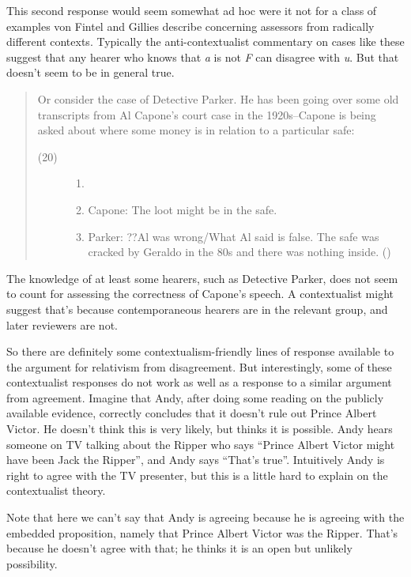 \documentclass[
  11pt,
  letterpaper,
  DIV=11,
  numbers=noendperiod,
  twoside]{scrartcl}
\begin{document}
This second response would seem somewhat ad hoc were it not for a class
of examples von Fintel and Gillies describe concerning assessors from
radically different contexts. Typically the anti-contextualist
commentary on cases like these suggest that any hearer who knows that
\emph{a} is not \emph{F} can disagree with \emph{u}. But that doesn't
seem to be in general true.

\begin{quote}
Or consider the case of Detective Parker. He has been going over some
old transcripts from Al Capone's court case in the 1920s--Capone is
being asked about where some money is in relation to a particular safe:

\begin{description}
\item[(20)]
\begin{enumerate}
\def\labelenumi{\arabic{enumi}.}
\item[]
\item
  Capone: The loot might be in the safe.
\item
  Parker: ??Al was wrong/What Al said is false. The safe was cracked by
  Geraldo in the 80s and there was nothing inside.
  ()
\end{enumerate}
\end{description}
\end{quote}

The knowledge of at least some hearers, such as Detective Parker, does
not seem to count for assessing the correctness of Capone's speech. A
contextualist might suggest that's because contemporaneous hearers are
in the relevant group, and later reviewers are not.

So there are definitely some contextualism-friendly lines of response
available to the argument for relativism from disagreement. But
interestingly, some of these contextualist responses do not work as well
as a response to a similar argument from agreement. Imagine that Andy,
after doing some reading on the publicly available evidence, correctly
concludes that it doesn't rule out Prince Albert Victor. He doesn't
think this is very likely, but thinks it is possible. Andy hears someone
on TV talking about the Ripper who says ``Prince Albert Victor might
have been Jack the Ripper'', and Andy says ``That's true''. Intuitively
Andy is right to agree with the TV presenter, but this is a little hard
to explain on the contextualist theory.

Note that here we can't say that Andy is agreeing because he is agreeing
with the embedded proposition, namely that Prince Albert Victor was the
Ripper. That's because he doesn't agree with that; he thinks it is an
open but unlikely possibility.
\end{document}

